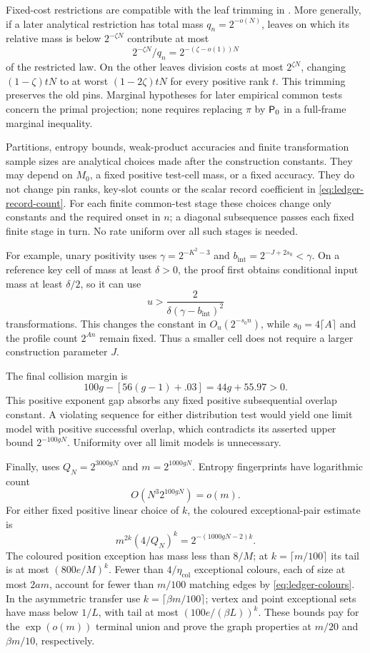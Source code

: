 Fixed-cost restrictions are compatible with the leaf trimming in
.  More generally, if a later analytical restriction
has total mass \(q_n=2^{-o(N)}\), leaves on which its relative mass
is below \(2^{-\zeta N}\) contribute at most
\[
 2^{-\zeta N}/q_n=2^{-(\zeta-o(1))N}
\]
of the restricted law.  On the other leaves division costs at most
\(2^{\zeta N}\), changing \((1-\zeta)tN\) to at worst
\((1-2\zeta)tN\) for every positive rank \(t\).  This trimming
preserves the old pins.  Marginal hypotheses for later empirical
common tests concern the primal projection; none requires replacing
\(\pi\) by \({\mathsf P_0}\) in a full-frame marginal inequality.

Partitions, entropy bounds, weak-product accuracies and finite
transformation sample sizes are analytical choices made after the
construction constants.  They may depend on \(M_0\), a fixed positive
test-cell mass, or a fixed accuracy.  They do not change pin ranks,
key-slot counts or the scalar record coefficient in
\eqref{eq:ledger-record-count}.  For each finite common-test stage
these choices change only constants and the required onset in
\(n\); a diagonal subsequence passes each fixed finite stage in
turn.  No rate uniform over all such stages is needed.

For example, unary positivity uses
\(\gamma=2^{-K^2-3}\) and \(b_{\mathrm{int}}=2^{-J+2s_0}<\gamma\).
On a reference key cell of mass at least \(\delta>0\), the proof
first obtains conditional input mass at least \(\delta/2\), so it
can use
\[
 u>\frac{2}{\delta(\gamma-b_{\mathrm{int}})^2}
\]
transformations.  This changes the constant in
\(O_u(2^{-s_0n})\), while \(s_0=4\lceil A\rceil\) and the profile
count \(2^{An}\) remain fixed.  Thus a smaller cell does not require
a larger construction parameter \(J\).

The final collision margin is
\[
 100g-[56(g-1)+.03]=44g+55.97>0.
\]
This positive exponent gap absorbs any fixed positive subsequential
overlap constant.  A violating sequence for either distribution
test would yield one limit model with positive successful overlap,
which contradicts its asserted upper bound \(2^{-100gN}\).
Uniformity over all limit models is unnecessary.

Finally,  uses
\(Q_N=2^{3000gN}\) and \(m=2^{1000gN}\).  Entropy fingerprints
have logarithmic count
\[
 O(N^3 2^{100gN})=o(m).
\]
For either fixed positive linear choice of \(k\), the coloured
exceptional-pair estimate is
\[
 m^{2k}(4/Q_N)^k=2^{-(1000gN-2)k}.
\]
The coloured position exception has mass less than \(8/M\);
at \(k=\lceil m/100\rceil\) its tail is at most
\((800e/M)^k\).  Fewer than \(4/\eta_{\mathrm{col}}\)
exceptional colours, each of size at most \(2am\), account for
fewer than \(m/100\) matching edges by
\eqref{eq:ledger-colours}.  In the asymmetric transfer use
\(k=\lceil\beta m/100\rceil\); vertex and point exceptional
sets have mass below \(1/L\), with tail at most
\((100e/(\beta L))^k\).  These bounds pay for the
\(\exp(o(m))\) terminal union and prove the graph properties
at \(m/20\) and \(\beta m/10\), respectively.
